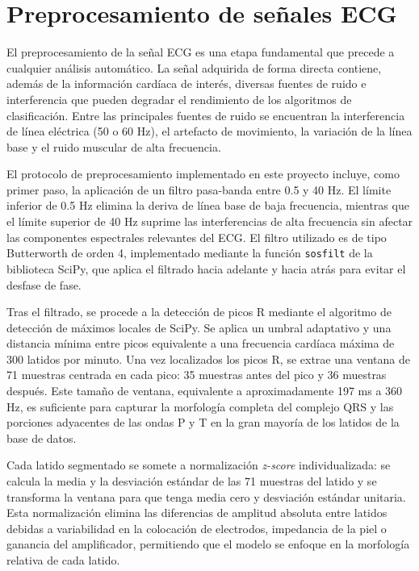 \section{Preprocesamiento de señales ECG}

El preprocesamiento de la señal ECG es una etapa fundamental que precede a cualquier análisis automático. La señal adquirida de forma directa contiene, además de la información cardíaca de interés, diversas fuentes de ruido e interferencia que pueden degradar el rendimiento de los algoritmos de clasificación. Entre las principales fuentes de ruido se encuentran la interferencia de línea eléctrica (50 o 60 Hz), el artefacto de movimiento, la variación de la línea base y el ruido muscular de alta frecuencia.

El protocolo de preprocesamiento implementado en este proyecto incluye, como primer paso, la aplicación de un filtro pasa-banda entre 0.5 y 40 Hz. El límite inferior de 0.5 Hz elimina la deriva de línea base de baja frecuencia, mientras que el límite superior de 40 Hz suprime las interferencias de alta frecuencia sin afectar las componentes espectrales relevantes del ECG. El filtro utilizado es de tipo Butterworth de orden 4, implementado mediante la función \texttt{sosfilt} de la biblioteca SciPy, que aplica el filtrado hacia adelante y hacia atrás para evitar el desfase de fase.

Tras el filtrado, se procede a la detección de picos R mediante el algoritmo de detección de máximos locales de SciPy. Se aplica un umbral adaptativo y una distancia mínima entre picos equivalente a una frecuencia cardíaca máxima de 300 latidos por minuto. Una vez localizados los picos R, se extrae una ventana de 71 muestras centrada en cada pico: 35 muestras antes del pico y 36 muestras después. Este tamaño de ventana, equivalente a aproximadamente 197 ms a 360 Hz, es suficiente para capturar la morfología completa del complejo QRS y las porciones adyacentes de las ondas P y T en la gran mayoría de los latidos de la base de datos.

Cada latido segmentado se somete a normalización \textit{z-score} individualizada: se calcula la media y la desviación estándar de las 71 muestras del latido y se transforma la ventana para que tenga media cero y desviación estándar unitaria. Esta normalización elimina las diferencias de amplitud absoluta entre latidos debidas a variabilidad en la colocación de electrodos, impedancia de la piel o ganancia del amplificador, permitiendo que el modelo se enfoque en la morfología relativa de cada latido.

